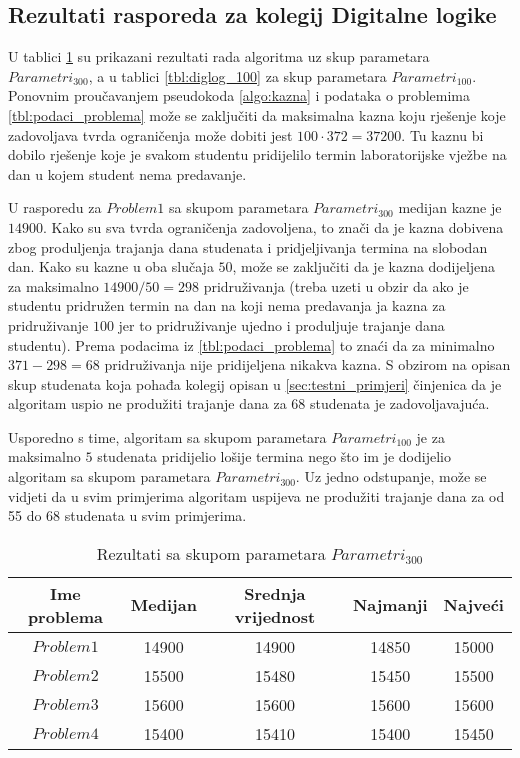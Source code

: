 \documentclass[times, utf8, zavrsni]{fer}
\begin{document}
\subsection{Rezultati rasporeda za kolegij Digitalne logike}
U tablici \ref{tbl:diglog_300} su prikazani rezultati rada algoritma uz skup parametara $Parametri_{300}$, a u tablici \ref{tbl:diglog_100} za skup parametara $Parametri_{100}$.
Ponovnim proučavanjem pseudokoda \ref{algo:kazna} i podataka o problemima \ref{tbl:podaci_problema} može se zaključiti da maksimalna kazna koju rješenje koje zadovoljava
tvrda ograničenja može dobiti jest $100 \cdot 372 = 37200$. Tu kaznu bi dobilo rješenje koje je svakom studentu pridijelilo termin laboratorijske vježbe na dan u kojem
student nema predavanje.

U rasporedu za $Problem1$ sa skupom parametara $Parametri_{300}$ medijan kazne je $14900$. Kako su sva tvrda ograničenja zadovoljena, to znači da je kazna dobivena zbog
produljenja trajanja dana studenata i pridjeljivanja termina na slobodan dan. Kako su kazne u oba slučaja $50$, može se zaključiti da je kazna dodijeljena za
maksimalno $14900 / 50 = 298$ pridruživanja (treba uzeti u obzir da ako je studentu pridružen termin na dan na koji nema predavanja ja kazna za pridruživanje $100$ jer
to pridruživanje ujedno i produljuje trajanje dana studentu). Prema podacima iz \ref{tbl:podaci_problema} to znaći da za minimalno $371 - 298 = 68$ pridruživanja nije
pridijeljena nikakva kazna. S obzirom na opisan skup studenata koja pohađa kolegij opisan u \ref{sec:testni_primjeri} činjenica da je algoritam uspio ne produžiti
trajanje dana za $68$ studenata je zadovoljavajuća.

Usporedno s time, algoritam sa skupom parametara $Parametri_{100}$ je za maksimalno $5$ studenata pridijelio lošije termina nego što im je dodijelio algoritam sa skupom parametara
$Parametri_{300}$. Uz jedno odstupanje, može se vidjeti da u svim primjerima algoritam uspijeva ne produžiti trajanje dana za od 55 do 68 studenata u svim primjerima.




\begin{table}
  \caption{Rezultati sa skupom parametara $Parametri_{300}$}
  \label{tbl:diglog_300}
  \centering
  \begin{tabular}{c | c | c | c | c }
    Ime problema &  Medijan & Srednja vrijednost & Najmanji & Najveći \\ \hline
    $Problem1$ & 14900 & 14900 & 14850 & 15000 \\ \hline
    $Problem2$ & 15500 & 15480 & 15450 & 15500 \\ \hline
    $Problem3$ & 15600 & 15600 & 15600 & 15600 \\ \hline
    $Problem4$ & 15400 & 15410 & 15400 & 15450
  \end{tabular}
\end{table}
\end{document}
